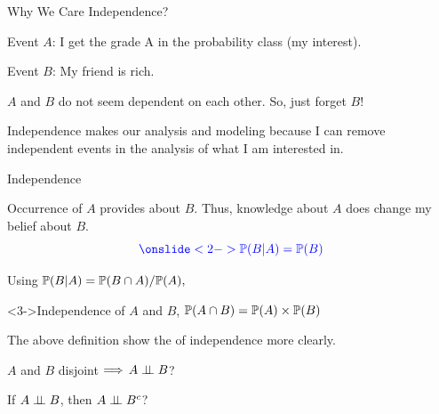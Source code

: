 \documentclass[fleqn,aspectratio=169]{beamer}
\begin{document}
\begin{frame}{Why We Care Independence?}

\plitemsep 0.1in
\bci 

\item<2-> Event $A$: I get the grade A in the probability class (my interest).
\item<2-> Event $B$: My friend is rich. 

\bigskip
\item<3-> $A$ and $B$ do not seem dependent on each other. So, just forget $B$!

\item<4-> Independence makes our analysis and modeling  because I can remove independent events in the analysis of what I am interested in.  
\eci 
\end{frame}


\begin{frame}{Independence}

\plitemsep 0.05in
\bci 

\item<1-> Occurrence of $A$ provides  about $B.$ Thus, knowledge about $A$ does  change my belief about $B.$ 
$$
\bluef{
\onslide<2->{
\cprob{B | A} = \cprob{B}
}}
$$


\item<3-> Using $\mathbb{P}( B | A ) = \mathbb{P}( B \cap A )/\mathbb{P}( A ),$ 

\begin{block}<3->{Independence of $A$ and $B$, }
$\mathbb{P}( A \cap B ) = \mathbb{P}( A ) \times \mathbb{P}( B )$
\end{block}

\item<4-> The above definition show the  of independence more clearly.

\item<5->  $A$ and $B$ disjoint $\Longrightarrow$ $A \perp \!\!\! \perp B$?


\item<7->  If $A \perp \!\!\! \perp B$,  then $A \perp \!\!\! \perp B^c$?  
\eci 
\end{frame}
\end{document}
